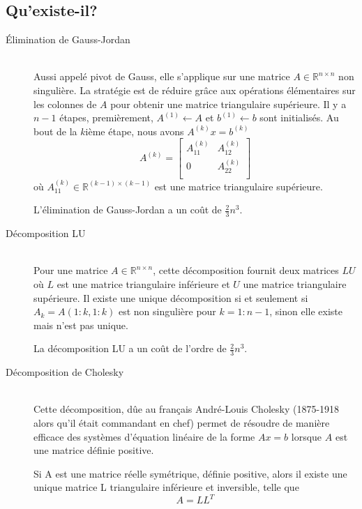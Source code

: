 \subsection{Qu'existe-il?}
\begin{description}
  \item[\'Elimination de Gauss-Jordan] \hfill \\
Aussi appel\'e pivot de Gauss, elle s'applique sur une matrice $A \in \mathbb{R}^{n\times n}$ non singuli\`ere.
 La strat\'egie est de r\'eduire gr\^ace aux op\'erations \'el\'ementaires sur les colonnes de $A$ pour obtenir une matrice triangulaire sup\'erieure. 
Il y a $n-1$ \'etapes, premi\`erement, $A^{(1)}\leftarrow A$ et $b^{(1)}\leftarrow b$ sont initialis\'es. Au bout
de la $k$i\`eme \'etape, nous avons $A^{(k)}x=b^{(k)}$ %
$$A^{(k)}= \left[
\begin{array}{rl}
 A^{(k)}_{11} & A^{(k)}_{12} \\
 0       & A^{(k)}_{22} \\
\end{array}\right]$$
o\`u $A^{(k)}_{11} \in \mathbb{R}^{(k-1)\times(k-1)}$ est une matrice triangulaire sup\'erieure.

L'\'elimination de Gauss-Jordan a un coût de $\frac{2}{3}n^3$.


  \item[D\'ecomposition LU] \hfill \\
Pour une matrice $A\in \mathbb{R}^{n\times n}$, cette d\'ecomposition fournit deux matrices $LU$ o\`u
$L$ est une matrice triangulaire inf\'erieure et $U$ une matrice triangulaire sup\'erieure. Il existe une unique d\'ecomposition si
et seulement si $A_k=A(1:k,1:k)$ est non singuli\`ere pour $k=1:n-1$, sinon elle existe mais n'est pas unique.

La d\'ecomposition LU a un coût de l'ordre de $\frac{2}{3}n^3$.


  \item[D\'ecomposition de Cholesky] \hfill \\


Cette d\'ecomposition, dûe au fran\c{c}ais Andr\'e-Louis Cholesky (1875-1918 alors qu'il \'etait commandant en chef) permet de r\'esoudre de mani\`ere efficace des syst\`emes
 d'\'equation lin\'eaire de la forme $Ax=b$ lorsque $A$ est une matrice d\'efinie positive.

\begin{frtheoreme}
 Si A est une matrice r\'eelle sym\'etrique,  d\'efinie positive, alors il existe une unique matrice L
triangulaire inf\'erieure et inversible, telle que
 $$A = LL^T$$
\end{frtheoreme}




\end{description}
